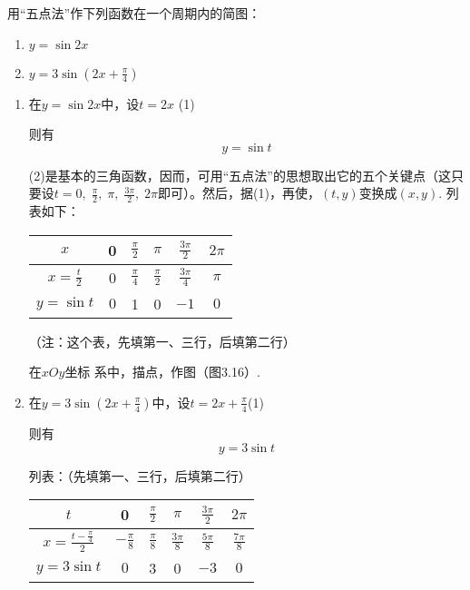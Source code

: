 \begin{example}
用“五点法”作下列函数在一个周期内的简图：
\begin{multicols}{2}
\begin{enumerate}[(1)]
    \item $y=\sin 2x$
    \item $y=3\sin\left(2x+\frac{\pi}{4}\right)$
\end{enumerate}
\end{multicols}
\end{example}

\begin{solution}
\begin{enumerate}[(1)]
    \item 在$y=\sin 2x$中，设$t=2x$ \hfill(1)

则有
\begin{equation}
    y=\sin t \tag{2}
\end{equation}

(2)是基本的三角函数，因而，可用“五点法”的思想取出它的五个关键点（这只要设$t=0,\; \frac{\pi}{2},\;\pi,\;\frac{3\pi}{2},\; 2\pi$即可）。然后，据(1)，再使，$(t,y)$变换成$(x,y)$. 列表如下：
\begin{center}
\begin{tabular}{c|ccccc}
\hline
$x$ & 0&$\frac{\pi}{2}$& $\pi$& $\frac{3\pi}{2}$& $2\pi$\\[1.5ex]
\hline
$x=\frac{t}{2}$& 0&$\frac{\pi}{4}$&$\frac{\pi}{2}$&$\frac{3\pi}{4}$&$\pi$\\[1.5ex]
$y=\sin t$& $0$&1&0&$-1$&$0$\\
\hline
\end{tabular}
\end{center}
（注：这个表，先填第一、三行，后填第二行）

在$xOy$坐标 系中，描点，作图（图3.16）.

\item 在$y=3\sin\left(2x+\frac{\pi}{4}\right)$中，设$t=2x+\frac{\pi}{4}$\hfill(1)

则有
\begin{equation}
    y=3\sin t \tag{2}
\end{equation}

列表：（先填第一、三行，后填第二行）
\begin{center}
\begin{tabular}{c|ccccc}
\hline
$t$ & 0&$\frac{\pi}{2}$& $\pi$& $\frac{3\pi}{2}$& $2\pi$\\[1.5ex]
\hline
$x=\frac{t-\frac{\pi}{4}}{2}$& $-\frac{\pi}{8}$&$\frac{\pi}{8}$&$\frac{3\pi}{8}$&$\frac{5\pi}{8}$&$\frac{7\pi}{8}$\\[1.5ex]
$y=3\sin t$& $0$&3&0&$-3$&$0$\\[1.5ex]
\hline
\end{tabular}
\end{center}


\end{enumerate}
\end{solution}
